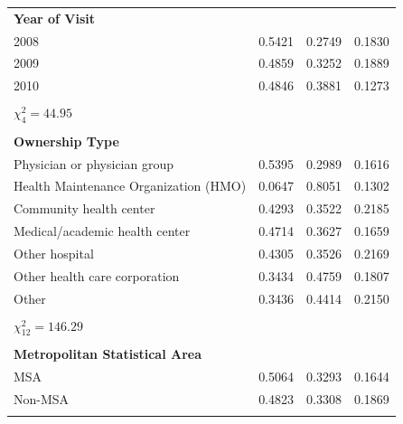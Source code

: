 \documentclass[12pt]{report}
\begin{document}
{\begin{center}
\begin{longtable}{lccc}
\textbf{Year of Visit}                 &          &            &            \\
2008                                   & 0.5421   & 0.2749     & 0.1830     \\
2009                                   & 0.4859   & 0.3252     & 0.1889     \\
2010                                   & 0.4846   & 0.3881     & 0.1273     \\
                                       &          &            &            \\
$\chi^2_4 = 44.95$                     &          &            &            \\
                                       &          &            &            \\
\textbf{Ownership Type}                &          &            &            \\
Physician or physician group           & 0.5395   & 0.2989     & 0.1616     \\
Health Maintenance Organization (HMO)  & 0.0647   & 0.8051     & 0.1302     \\
Community health center                & 0.4293   & 0.3522     & 0.2185     \\
Medical/academic health center         & 0.4714   & 0.3627     & 0.1659     \\
Other hospital                         & 0.4305   & 0.3526     & 0.2169     \\
Other health care corporation          & 0.3434   & 0.4759     & 0.1807     \\
Other                                  & 0.3436   & 0.4414     & 0.2150     \\
                                       &          &            &            \\
$\chi^2_{12} = 146.29$                 &          &            &            \\
                                       &          &            &            \\
\textbf{Metropolitan Statistical Area} &          &            &            \\
MSA                                    & 0.5064   & 0.3293     & 0.1644     \\
Non-MSA                                & 0.4823   & 0.3308     & 0.1869     \\
                                       &          &            &            \\

\end{longtable}
\end{center}}
\end{document}
